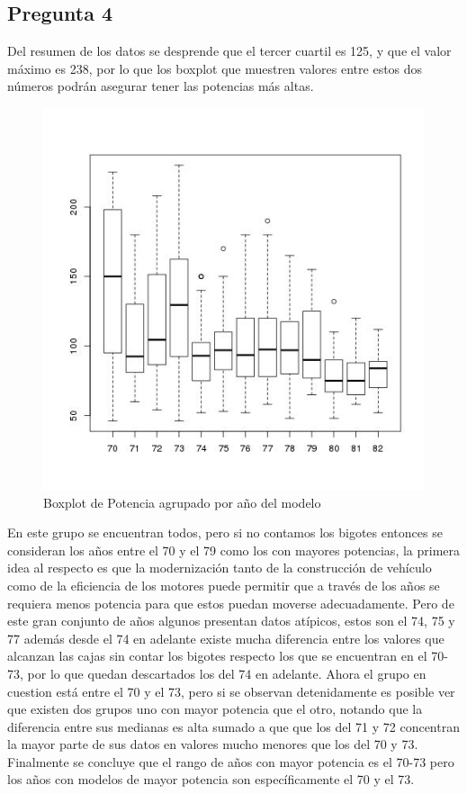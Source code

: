 \documentclass[letter,10pt]{article}
\begin{document}
\subsection{Pregunta 4}
Del resumen de los datos se desprende que el tercer cuartil es 125, y que el valor máximo es 238, por lo que
los boxplot que muestren valores entre estos dos números podrán asegurar tener las potencias más altas.
\begin{figure}[h!]
    \centering
    \includegraphics[scale=0.5]{boxplot_horsepower_model_year.jpg}
    \caption{Boxplot de Potencia agrupado por año del modelo}
    \label{fig:boxplot_horsepower_model_year}
\end{figure}

En este grupo se encuentran todos, pero si no contamos los bigotes entonces se consideran los años
entre el 70 y el 79 como los con mayores potencias, la primera idea al respecto es que la modernización tanto de la construcción
de vehículo como de la eficiencia de los motores puede permitir que a través de los años se requiera menos potencia para que estos
puedan moverse adecuadamente. Pero de este gran conjunto de años algunos presentan datos atípicos, estos son el 74, 75 y 77 además desde el 74 en adelante existe
mucha diferencia entre los valores que alcanzan las cajas sin contar los bigotes respecto los que se encuentran en el 70-73, por lo que quedan descartados los del 74 en adelante.
Ahora el grupo en cuestion está entre el 70 y el 73, pero si se observan detenidamente es posible ver que existen dos grupos uno con mayor potencia que el otro, 
notando que la diferencia entre sus medianas es alta sumado a que que los del 71 y 72
concentran la mayor parte de sus datos en valores mucho menores que los del 70 y 73.
Finalmente se concluye que el rango de años con mayor potencia es el 70-73 pero los años con modelos de mayor potencia son específicamente el 70 y el 73.
\end{document}
